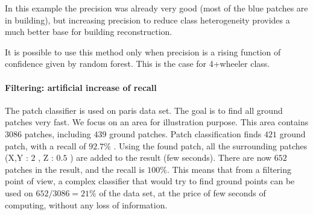 				In this example the precision was already very good (most of the blue patches are in building), but increasing precision to reduce class heterogeneity provides a much better base for building reconstruction.
				
				It is possible to use this method only when precision is  a rising function of confidence given by random forest.
				This is the case for 4+wheeler class.  
			\paragraph{Filtering: artificial increase of recall}
				The patch classifier is used on paris data set.
				The goal is to find all ground patches very fast.
				We focus on an area for illustration purpose. This area contains $3086$ patches, including $439$ ground patches.
				Patch classification finds $421$ ground patch, 
				with a recall of $92.7$\% .
				Using the found patch, all the surrounding patches (X,Y : $2$ \meter, Z : $0.5$ \meter ) are added to the result (few seconds).
				There are now $652$ patches in the result, and the recall is $100$\%.
				This means that from a filtering point of view, a complex classifier that would try to find ground points can be used on $652/3086=21\%$ of the data set, at the price of few seconds of computing, without any loss of information.
				
					 	  